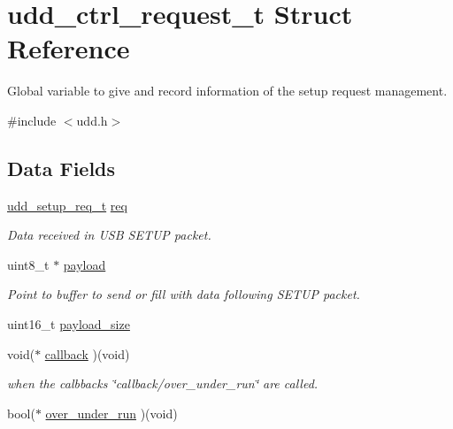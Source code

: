 \hypertarget{structudd__ctrl__request__t}{
\section{udd\-\_\-ctrl\-\_\-request\-\_\-t \-Struct \-Reference}
\label{structudd__ctrl__request__t}
}


\-Global variable to give and record information of the setup request management.  




{\ttfamily \#include $<$udd.\-h$>$}

\subsection*{\-Data \-Fields}
\begin{DoxyCompactItemize}
\item 
\hyperlink{structudd__setup__req__t}{udd\-\_\-setup\-\_\-req\-\_\-t} \hyperlink{structudd__ctrl__request__t_a911ea25898e490e2095496e5fe24b1fe}{req}
\begin{DoxyCompactList}\small\item\em \-Data received in \-U\-S\-B \-S\-E\-T\-U\-P packet. \end{DoxyCompactList}\item 
uint8\-\_\-t $\ast$ \hyperlink{structudd__ctrl__request__t_a30ee45cc3e128d219f779f32635b6ca0}{payload}
\begin{DoxyCompactList}\small\item\em \-Point to buffer to send or fill with data following \-S\-E\-T\-U\-P packet. \end{DoxyCompactList}\item 
uint16\-\_\-t \hyperlink{structudd__ctrl__request__t_a0ba5f434c1f252576dd707db0034917c}{payload\-\_\-size}
\item 
void($\ast$ \hyperlink{structudd__ctrl__request__t_a942a0402e868519a5ce6864941dd939e}{callback} )(void)
\begin{DoxyCompactList}\small\item\em when the calbbacks \char`\"{}callback/over\-\_\-under\-\_\-run\char`\"{} are called. \end{DoxyCompactList}\item 
bool($\ast$ \hyperlink{structudd__ctrl__request__t_afb9dab5e58e325dae17ea02345b097c4}{over\-\_\-under\-\_\-run} )(void)
\end{DoxyCompactItemize}


